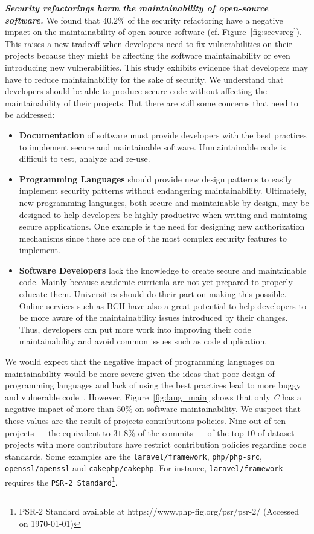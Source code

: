\documentclass[10pt,conference]{IEEEtran}
\begin{document}
\textbf{\textit{Security refactorings harm the maintainability of open-source software.}}
%
We found that $40.2\%$ of the security refactoring have a negative impact on the
maintainability of open-source software (cf. Figure~\ref{fig:secvsreg}). This raises
a new tradeoff when developers need to fix vulnerabilities on their projects
because they might be affecting the software maintainability or even introducing
new vulnerabilities. This study exhibits evidence that developers may have to
reduce maintainability for the sake of security. We understand that developers
should be able to produce secure code without affecting the maintainability of
their projects. But there are still some concerns that need to be addressed:
\begin{itemize}
	\item \textbf{Documentation} of software must provide developers with the
	best practices to implement secure and maintainable software. Unmaintainable
	code is difficult to test, analyze and re-use.

	\item\textbf{Programming Languages} should provide new design patterns to
	easily implement security patterns without endangering maintainability.
	Ultimately, new programming languages, both secure and maintainable by design,
	may be designed to help developers be highly productive when writing and
	maintaing  secure applications. One example is the need for designing new
	authorization mechanisms since these are one of the most complex security
	features to implement.

	\item \textbf{Software Developers} lack the knowledge to create secure and
	maintainable code. Mainly because academic curricula are not yet prepared
	to properly educate them. Universities should do their part on making
	this possible. Online services such as BCH have also a great potential to help
	developers to be more aware of the maintainability issues introduced by their
	changes. Thus, developers can put more work into improving their code maintainability
	and avoid common issues such as code duplication.

\end{itemize}


We would expect that the negative impact of programming languages on
maintainability would be more severe given the ideas that poor design of programming languages and lack of using
the best practices lead to more buggy and vulnerable
code~\cite{Ray:2017:LSP:3144574.3126905, 2019arXiv190110220B}. However,
Figure~\ref{fig:lang_main} shows that only \emph{C} has a negative impact of
more than $50\%$ on software maintainability. We suspect that these values are
the result of projects contributions policies. Nine out of ten projects --- the
equivalent to $31.8\%$ of the commits --- of the top-$10$ of dataset projects
with more contributors have restrict contribution policies regarding code
standards. Some examples are the \texttt{laravel/framework},
\texttt{php/php-src}, \texttt{openssl/openssl} and \texttt{cakephp/cakephp}. For
instance, \texttt{laravel/framework} requires the \texttt{PSR-2
Standard}\footnote{PSR-2 Standard available at
https://www.php-fig.org/psr/psr-2/ (Accessed on \today{})}.
\end{document}
